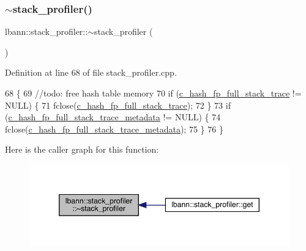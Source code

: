 \subsubsection{\texorpdfstring{$\sim$stack\+\_\+profiler()}{~stack\_profiler()}}
{\footnotesize\ttfamily lbann\+::stack\+\_\+profiler\+::$\sim$stack\+\_\+profiler (\begin{DoxyParamCaption}{ }\end{DoxyParamCaption})\hspace{0.3cm}{\ttfamily [private]}}



Definition at line 68 of file stack\+\_\+profiler.\+cpp.


\begin{DoxyCode}
68                                 \{
69   \textcolor{comment}{//todo: free hash table memory}
70   \textcolor{keywordflow}{if} (\hyperlink{stack__profiler_8cpp_a6cc00bff1b0fcee1e92c726aea92c818}{c\_hash\_fp\_full\_stack\_trace} != NULL) \{
71     fclose(\hyperlink{stack__profiler_8cpp_a6cc00bff1b0fcee1e92c726aea92c818}{c\_hash\_fp\_full\_stack\_trace});
72   \}
73   \textcolor{keywordflow}{if} (\hyperlink{stack__profiler_8cpp_a434aed2bad9781985a12de882aa0ec84}{c\_hash\_fp\_full\_stack\_trace\_metadata} != NULL) \{
74     fclose(\hyperlink{stack__profiler_8cpp_a434aed2bad9781985a12de882aa0ec84}{c\_hash\_fp\_full\_stack\_trace\_metadata});
75   \}
76 \}
\end{DoxyCode}
Here is the caller graph for this function\+:\nopagebreak
\begin{figure}[H]
\begin{center}
\leavevmode
\includegraphics[width=346pt]{classlbann_1_1stack__profiler_a57329b6f2822f91e6dad13b19bcc81d9_icgraph}
\end{center}
\end{figure}
\mbox{\label{classlbann_1_1stack__profiler_af52b4bc426a0728860b00a4fb7fd500f}} 
